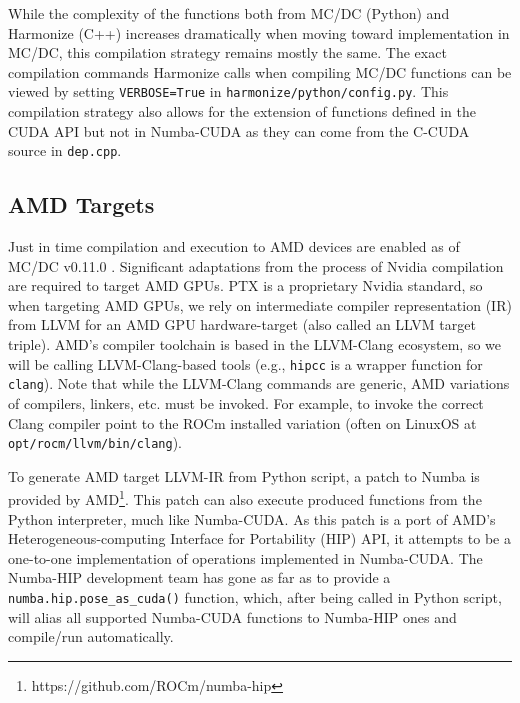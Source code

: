 While the complexity of the functions both from MC/DC (Python) and Harmonize (C++) increases dramatically when moving toward implementation in MC/DC, this compilation strategy remains mostly the same.
The exact compilation commands Harmonize calls when compiling MC/DC functions can be viewed by setting \texttt{VERBOSE=True} in \texttt{harmonize/python/config.py}.
This compilation strategy also allows for the extension of functions defined in the CUDA API but not in Numba-CUDA as they can come from the C-CUDA source in \texttt{dep.cpp}.

\subsection{AMD Targets}
Just in time compilation and execution to AMD devices are enabled as of MC/DC v0.11.0 \cite{transport_cement_mcdc_2024}.
Significant adaptations from the process of Nvidia compilation are required to target AMD GPUs.
PTX is a proprietary Nvidia standard, so when targeting AMD GPUs, we rely on intermediate compiler representation (IR) from LLVM for an AMD GPU hardware-target (also called an LLVM target triple).
AMD's compiler toolchain is based in the LLVM-Clang ecosystem, so we will be calling LLVM-Clang-based tools (e.g., \texttt{hipcc} is a wrapper function for \texttt{clang}).
Note that while the LLVM-Clang commands are generic, AMD variations of compilers, linkers, etc. must be invoked.
For example, to invoke the correct Clang compiler point to the ROCm installed variation (often on LinuxOS at \texttt{opt/rocm/llvm/bin/clang}).

To generate AMD target LLVM-IR from Python script, a patch to Numba is provided by AMD\footnote{https://github.com/ROCm/numba-hip}.
This patch can also execute produced functions from the Python interpreter, much like Numba-CUDA.
As this patch is a port of AMD's Heterogeneous-computing Interface for Portability (HIP) API, it attempts to be a one-to-one implementation of operations implemented in Numba-CUDA.%
The Numba-HIP development team has gone as far as to provide a \texttt{numba.hip.pose\_as\_cuda()} function, which, after being called in Python script, will alias all supported Numba-CUDA functions to Numba-HIP ones and compile/run automatically.

